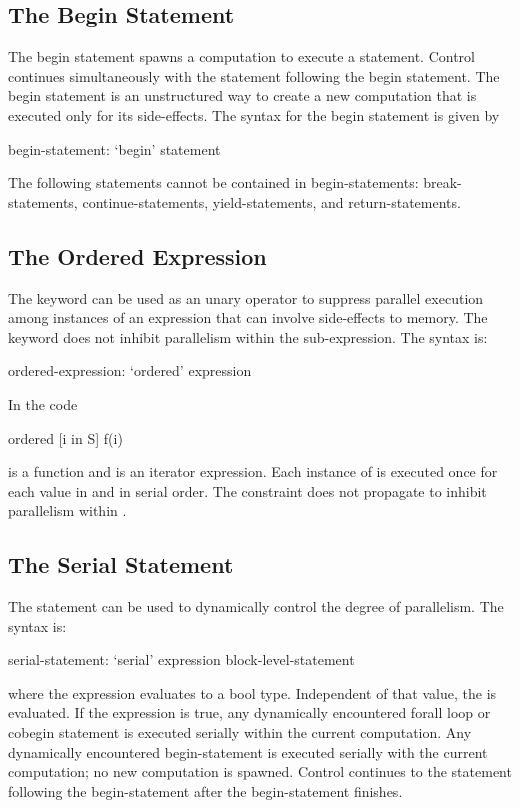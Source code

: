 \subsection{The Begin Statement}
\label{Begin}

The begin statement spawns a computation to execute a statement.
Control continues simultaneously with the statement following the
begin statement. The begin statement is an unstructured way to create
a new computation that is executed only for its side-effects. The
syntax for the begin statement is given by
\begin{syntax}
begin-statement:
  `begin' statement
\end{syntax}

The following statements cannot be contained in begin-statements:
break-statements, continue-statements, yield-statements, and
return-statements.

\subsection{The Ordered Expression}
\label{Ordered_Expressions}

The  keyword can be used as an unary operator to suppress
parallel execution among instances of an expression that can involve
side-effects to memory.  The  keyword does not inhibit
parallelism within the sub-expression.  The syntax is:
\begin{syntax}
ordered-expression:
   `ordered' expression
\end{syntax}

\begin{example}
In the code
\begin{chapel}
ordered [i in S] f(i) 
\end{chapel}
 is a function and  is an iterator expression. Each
instance of  is executed once for each value in 
and in serial order. The  constraint does not propagate
to inhibit parallelism within .
\end{example}

\subsection{The Serial Statement}
\label{Serial}

The  statement can be used to dynamically control the
degree of parallelism.  The syntax is:
\begin{syntax}
serial-statement:
  `serial' expression block-level-statement
\end{syntax}
where the expression evaluates to a bool type.  Independent of that
value, the  is evaluated. If the
expression is true, any dynamically encountered forall loop or cobegin
statement is executed serially within the current computation.  Any
dynamically encountered begin-statement is executed serially with the
current computation; no new computation is spawned.  Control continues
to the statement following the begin-statement after the
begin-statement finishes.

